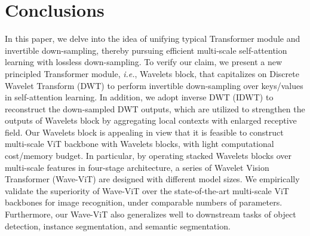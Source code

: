 \documentclass[runningheads]{llncs}
\begin{document}
\section{Conclusions}

In this paper, we delve into the idea of unifying typical Transformer module and invertible down-sampling, thereby pursuing efficient multi-scale self-attention learning with
lossless down-sampling. To verify our claim, we present a new principled Transformer module, \emph{i.e.}, Wavelets block, that capitalizes on Discrete Wavelet Transform (DWT) to perform invertible down-sampling over keys/values in self-attention learning. In addition, we adopt inverse DWT (IDWT) to reconstruct the down-sampled DWT outputs, which are utilized to strengthen the outputs of Wavelets block by aggregating local contexts with enlarged receptive field. Our Wavelets block is appealing in view that it is feasible to construct multi-scale ViT backbone with Wavelets blocks, with light computational cost/memory budget. In particular, by operating stacked Wavelets blocks over multi-scale features in four-stage architecture, a series of Wavelet Vision Transformer (Wave-ViT) are designed with different model sizes. We empirically validate the superiority of Wave-ViT over the state-of-the-art multi-scale ViT backbones for image recognition, under comparable numbers of parameters. Furthermore, our Wave-ViT also generalizes well to downstream tasks of object detection, instance segmentation, and semantic segmentation.


\end{document}
